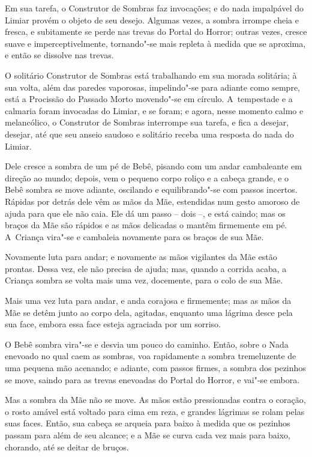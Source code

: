Em sua tarefa, o Construtor de Sombras faz invocações; e do nada
impalpável do Limiar provém o objeto de seu desejo. Algumas vezes, a
sombra irrompe cheia e fresca, e subitamente se perde nas trevas do
Portal do Horror; outras vezes, cresce suave e imperceptivelmente,
tornando"-se mais repleta à medida que se aproxima, e então se dissolve nas trevas.

\smallskip
O solitário Construtor de Sombras está trabalhando em sua morada
solitária; à sua volta, além das paredes vaporosas, impelindo"-se para
adiante como sempre, está a Procissão do Passado Morto movendo"-se em
círculo. A~tempestade e a calmaria foram invocadas do Limiar, e se
foram; e agora, nesse momento calmo e melancólico, o Construtor de
Sombras interrompe sua tarefa, e fica a desejar, desejar, até que seu
anseio saudoso e solitário receba uma resposta do nada do Limiar.

Dele cresce a sombra de um pé de Bebê, pisando com um andar cambaleante
em direção ao mundo; depois, vem o pequeno corpo roliço e a cabeça
grande, e o Bebê sombra se move adiante, oscilando e equilibrando"-se com
passos incertos. Rápidas por detrás dele vêm as mãos da Mãe, estendidas
num gesto amoroso de ajuda para que ele não caia. Ele dá um passo -- dois --,
e está caindo; mas os braços da Mãe são rápidos e as mãos
delicadas o mantêm firmemente em pé. A~Criança vira"-se e cambaleia
novamente para os braços de sua Mãe.

Novamente luta para andar; e novamente as mãos vigilantes da Mãe
estão prontas. Dessa vez, ele não precisa de ajuda; mas, quando a
corrida acaba, a Criança sombra se volta mais uma vez, docemente, para o
colo de sua Mãe.

Mais uma vez luta para andar, e anda corajosa e firmemente; mas as
mãos da Mãe se detêm junto ao corpo dela, agitadas, enquanto uma lágrima
desce pela sua face, embora essa face esteja agraciada por um sorriso.

O Bebê sombra vira"-se e desvia um pouco do caminho. Então, sobre o
Nada enevoado no qual caem as sombras, voa rapidamente a sombra
tremeluzente de uma pequena mão acenando; e adiante, com passos firmes,
a sombra dos pezinhos se move, saindo para as trevas enevoadas do Portal
do Horror, e vai"-se embora.

Mas a sombra da Mãe não se move. As mãos estão pressionadas contra o
coração, o rosto amável está voltado para cima em reza, e grandes
lágrimas se rolam pelas suas faces. Então, sua cabeça se arqueia para
baixo à medida que os pezinhos passam para além de seu alcance;
e a Mãe se curva cada vez mais para baixo, chorando, até se deitar de bruços.

